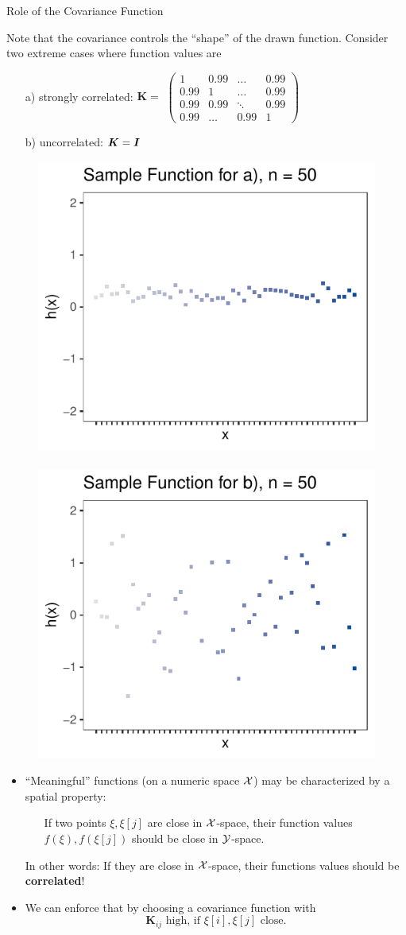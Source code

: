 \documentclass[11pt,compress,t,notes=noshow, xcolor=table]{beamer}
\begin{document}
\begin{vbframe}{Role of the Covariance Function}

Note that the covariance controls the \enquote{shape} of the drawn function. Consider two extreme cases where function values are

\begin{enumerate}
  \item[a)] strongly correlated: $\bm{K} = $ \footnotesize$ \begin{pmatrix} 1 & 0.99 & \dots & 0.99 \\
  0.99 & 1 & \dots & 0.99 \\
  0.99 & 0.99 & \ddots & 0.99 \\
  0.99 & \dots & 0.99 & 1 \end{pmatrix}$ \normalsize
  \item[b)] uncorrelated: $\bm{K} = \bm{I}$
\end{enumerate}

\begin{figure}
  \includegraphics[width=0.35\linewidth]{figure/discrete/example_extreme_50_1.pdf} ~~  \includegraphics[width=0.35\linewidth]{figure/discrete/example_extreme_50_2.pdf}
\end{figure}


\framebreak 

\begin{itemize}
  \item \enquote{Meaningful} functions (on a numeric space $\mathcal{X}$) may be characterized by a spatial property: \vspace*{0.2cm}
  \begin{itemize}
    \item[] If two points $\xi, \xi[j]$ are close in $\mathcal{X}$-space, their function values $f(\xi), f(\xi[j])$ should be close in $\mathcal{Y}$-space. 
  \end{itemize} \vspace*{0.2cm}
  In other words: If they are close in $\mathcal{X}$-space, their functions values should be \textbf{correlated}! \vspace*{0.4cm}
  \item We can enforce that by choosing a covariance function with  
  $$
    \bm{K}_{ij} \text{ high, if } \xi[i], \xi[j] \text{ close.}
  $$


\end{itemize}
\end{vbframe}
\end{document}
